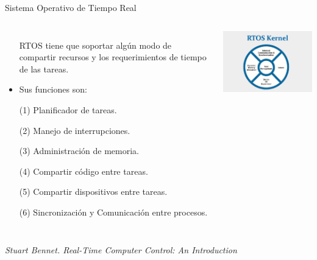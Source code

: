 \documentclass[8pt,aspectratio=169,compress]{beamer}
\begin{document}
\begin{frame}{Sistema Operativo de Tiempo Real}

   \begin{columns}[onlytextwidth,T]
     \column{\dimexpr\linewidth-50mm-5mm}

\begin{itemize}
  \item[RTOS] tiene que soportar algún modo de compartir recursos y los requerimientos de tiempo de las tareas. 

\item Sus funciones son:

\bigskip
(1) Planificador de tareas.

\bigskip
(2) Manejo de interrupciones.

\bigskip
(3) Administración de memoria.

\bigskip
(4) Compartir código entre tareas.

\bigskip
(5) Compartir dispositivos entre tareas.

\bigskip
(6) Sincronización y Comunicación entre procesos.

\bigskip
\bigskip
\end{itemize}
      \column{70mm}
    \includegraphics[width=80mm]{images/rtos.jpg}

    \end{columns}

\textit{Stuart Bennet. Real-Time Computer Control: An Introduction}
\end{frame}
\end{document}
